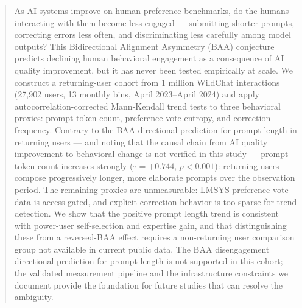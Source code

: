 \begin{abstract}
As AI systems improve on human preference benchmarks, do the humans interacting with them become less engaged --- submitting shorter prompts, correcting errors less often, and discriminating less carefully among model outputs? This Bidirectional Alignment Asymmetry (BAA) conjecture predicts declining human behavioral engagement as a consequence of AI quality improvement, but it has never been tested empirically at scale. We construct a returning-user cohort from 1 million WildChat interactions (27,902 users, 13 monthly bins, April 2023--April 2024) and apply autocorrelation-corrected Mann-Kendall trend tests to three behavioral proxies: prompt token count, preference vote entropy, and correction frequency. Contrary to the BAA directional prediction for prompt length in returning users --- and noting that the causal chain from AI quality improvement to behavioral change is not verified in this study --- prompt token count increases strongly ($\tau = +0.744$, $p < 0.001$): returning users compose progressively longer, more elaborate prompts over the observation period. The remaining proxies are unmeasurable: LMSYS preference vote data is access-gated, and explicit correction behavior is too sparse for trend detection. We show that the positive prompt length trend is consistent with power-user self-selection and expertise gain, and that distinguishing these from a reversed-BAA effect requires a non-returning user comparison group not available in current public data. The BAA disengagement directional prediction for prompt length is not supported in this cohort; the validated measurement pipeline and the infrastructure constraints we document provide the foundation for future studies that can resolve the ambiguity.
\end{abstract}
